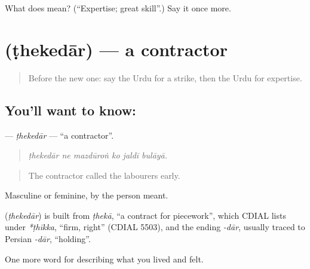 \begin{tcolorbox}[breakable,colback=teal!4,colframe=teal!35!black,title={Before you move on}]
What does  mean? (\textquotedblleft{}Expertise; great skill\textquotedblright{}.) Say it once more.
\end{tcolorbox}
\section[\texorpdfstring{\ur{ٹھیکیدار} (ṭhekedār)}{ٹھیکیدار (ṭhekedār)}]{ (ṭhekedār) — a contractor}

\label{lesson:UR-C495-thekedar}



\begin{quote}
Before the new one: say the Urdu for a strike, then the Urdu for expertise.
\end{quote}

\subsection*{You'll want to know: }
\textbf{} — \emph{ṭhekedār} — \textquotedblleft{}a contractor\textquotedblright{}.

\begin{quote}
     
\end{quote}

\begin{quote}
\emph{ṭhekedār ne mazdūroṅ ko jaldī bulāyā.}
\end{quote}

\begin{quote}
The contractor called the labourers early.
\end{quote}

Masculine or feminine, by the person meant.

\begin{cousinweb}
\textbf{} (\emph{ṭhekedār}) is built from \emph{ṭhekā}, \textquotedblleft{}a contract for piecework\textquotedblright{}, which CDIAL lists under \emph{*ṭhīkka}, \textquotedblleft{}firm, right\textquotedblright{} (CDIAL 5503), and the ending \emph{-dār}, usually traced to Persian \emph{-dār}, \textquotedblleft{}holding\textquotedblright{}.
\end{cousinweb}

\begin{grammarlens}[title={What you've built}]
One more word for describing what you lived and felt.
\end{grammarlens}

